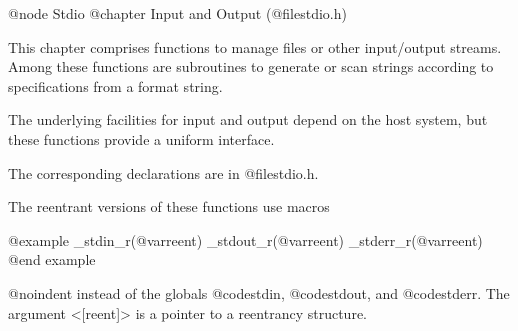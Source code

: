 @node Stdio
@chapter Input and Output (@file{stdio.h})

This chapter comprises functions to manage files
or other input/output streams. Among these functions are subroutines
to generate or scan strings according to specifications from a format string.

The underlying facilities for input and output depend on the host
system, but these functions provide a uniform interface.

The corresponding declarations are in @file{stdio.h}.

The reentrant versions of these functions use macros

@example
_stdin_r(@var{reent})
_stdout_r(@var{reent})
_stderr_r(@var{reent})
@end example

@noindent
instead of the globals @code{stdin}, @code{stdout}, and
@code{stderr}.  The argument <[reent]> is a pointer to a reentrancy
structure.

